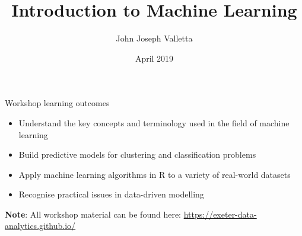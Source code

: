 \documentclass[pdf]{beamer}
\title[Introduction to Machine Learning]{Introduction to Machine Learning}
\author{John Joseph Valletta}
\date[April 2019]{April 2019}
\institute[]{University of Exeter, Penryn Campus, UK}
\begin{document}
\begin{frame}
\titlepage
\end{frame}

\begin{frame}{Workshop learning outcomes}
\begin{itemize}\addtolength{\itemsep}{0.7\baselineskip}
	\item Understand the key concepts and terminology used in the field of machine learning
	\item Build predictive models for clustering and classification problems
	\item Apply machine learning algorithms in R to a variety of real-world datasets
	\item Recognise practical issues in data-driven modelling
\end{itemize}

\vfill
\textbf{Note}: All workshop material can be found here: 
\href{https://exeter-data-analytics.github.io/}{https://exeter-data-analytics.github.io/}

\end{frame}
\end{document}

